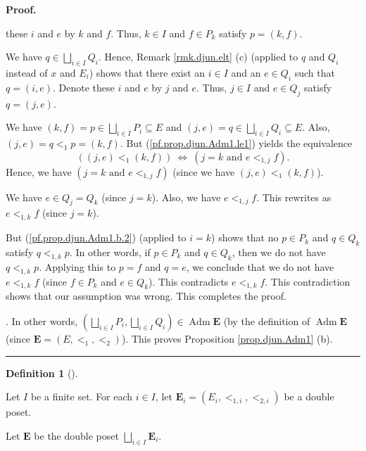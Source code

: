\documentclass[numbers=enddot,12pt,final,onecolumn,notitlepage,abstracton]{scrartcl}
\theoremstyle{definition}
\newtheorem{defi}[theo]{Definition}
\newenvironment{definition}[1][]
{\begin{defi}[#1]\begin{leftbar}}
{\end{leftbar}\end{defi}}
\newenvironment{proof}[1][Proof]{\noindent\textbf{#1.} }{\ \rule{0.5em}{0.5em}}
\newenvironment{verlong}{}{}
\begin{document}
\begin{verlong}
\begin{footnotesize}
\begin{proof}
{these $i$ and $e$ by $k$ and $f$. Thus, $k\in I$ and $f\in P_{k}$ satisfy
$p=\left(  k,f\right)  $.
\par
We have $q\in\bigsqcup_{i\in I}Q_{i}$. Hence, Remark \ref{rmk.djun.elt} (c)
(applied to $q$ and $Q_{i}$ instead of $x$ and $E_{i}$) shows that there exist
an $i\in I$ and an $e\in Q_{i}$ such that $q=\left(  i,e\right)  $. Denote
these $i$ and $e$ by $j$ and $e$. Thus, $j\in I$ and $e\in Q_{j}$ satisfy
$q=\left(  j,e\right)  $.
\par
We have $\left(  k,f\right)  =p\in\bigsqcup_{i\in I}P_{i}\subseteq E$ and
$\left(  j,e\right)  =q\in\bigsqcup_{i\in I}Q_{i}\subseteq E$. Also, $\left(
j,e\right)  =q<_{1}p=\left(  k,f\right)  $. But (\ref{pf.prop.djun.Adm1.le1})
yields the equivalence%
\[
\left(  \left(  j,e\right)  <_{1}\left(  k,f\right)  \right)
\ \Longleftrightarrow\ \left(  j=k\text{ and }e<_{1,j}f\right)  .
\]
Hence, we have $\left(  j=k\text{ and }e<_{1,j}f\right)  $ (since we have
$\left(  j,e\right)  <_{1}\left(  k,f\right)  $).
\par
We have $e\in Q_{j}=Q_{k}$ (since $j=k$). Also, we have $e<_{1,j}f$. This
rewrites as $e<_{1,k}f$ (since $j=k$).
\par
But (\ref{pf.prop.djun.Adm1.b.2}) (applied to $i=k$) shows that no $p\in
P_{k}$ and $q\in Q_{k}$ satisfy $q<_{1,k}p$. In other words, if $p\in P_{k}$
and $q\in Q_{k}$, then we do not have $q<_{1,k}p$. Applying this to $p=f$ and
$q=e$, we conclude that we do not have $e<_{1,k}f$ (since $f\in P_{k}$ and
$e\in Q_{k}$). This contradicts $e<_{1,k}f$. This contradiction shows that our
assumption was wrong. This completes the proof.}. In other words, $\left(
\bigsqcup_{i\in I}P_{i},\bigsqcup_{i\in I}Q_{i}\right)  \in\operatorname*{Adm}%
\mathbf{E}$ (by the definition of $\operatorname*{Adm}\mathbf{E}$ (since
$\mathbf{E}=\left(  E,<_{1},<_{2}\right)  $). This proves Proposition
\ref{prop.djun.Adm1} (b).
\end{proof}

\begin{definition}
\label{def.djun.Adm-bij}Let $I$ be a finite set. For each $i\in I$, let
$\mathbf{E}_{i}=\left(  E_{i},<_{1,i},<_{2,i}\right)  $ be a double poset.

Let $\mathbf{E}$ be the double poset $\bigsqcup_{i\in I}\mathbf{E}_{i}$.


\end{definition}
\end{footnotesize}
\end{verlong}
\end{document}
